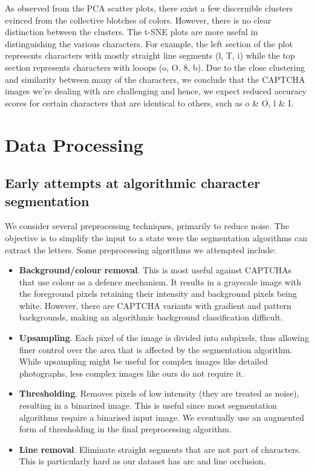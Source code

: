 \documentclass[twocolumn,10pt]{article}
\begin{document}
As observed from the PCA scatter plots, there exist a few discernible clusters evinced from the collective blotches of colors. However, there is no clear distinction between the clusters. The t-SNE plots are more useful in distinguishing the various characters. For example, the left section of the plot represents characters with mostly straight line segments (l, T, i) while the top section represents characters with looops (o, O, 8, b).
Due to the close clustering and similarity between many of the characters, we conclude that the CAPTCHA images we’re dealing with are challenging and hence, we expect reduced accuracy scores for certain characters that are identical to others, such as o \& O, l \& I.

\section{Data Processing}
\subsection{Early attempts at algorithmic character segmentation}
We consider several preprocessing techniques, primarily to reduce noise. The objective is to simplify the input to a state were the segmentation algorithms can extract the letters. Some preprocessing algorithms we attempted include:
\begin{itemize} 
\item \textbf{Background/colour removal}. This is most useful against CAPTCHAs that use colour as a defence mechanism. It results in a grayscale image with the foreground pixels retaining their intensity and background pixels being white. However, there are CAPTCHA variants with gradient and pattern backgrounds, making an algorithmic background classification difficult.
\item \textbf{Upsampling}. Each pixel of the image is divided into subpixels, thus allowing finer control over the area that is affected by the segmentation algorithm. While upsampling might be useful for complex images like detailed photographs, less complex images like ours do not require it.
\item \textbf{Thresholding}. Removes pixels of low intensity (they are treated as noise), resulting in a binarized image. This is useful since most segmentation algorithms require a binarised input image. We eventually use an augmented form of thresholding in the final preprocessing algorithm.
\item \textbf{Line removal}. Eliminate straight segments that are not part of characters. This is particularly hard as our dataset has arc and line occlusion.
\end{itemize}
\end{document}
